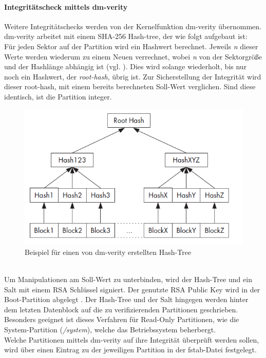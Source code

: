 	\paragraph{Integritätscheck mittels dm-verity}
	Weitere Integritätschecks werden von der Kernelfunktion dm-verity übernommen.
	dm-verity arbeitet mit einem SHA-256 Hash-tree, der wie folgt aufgebaut ist:\\
	Für jeden Sektor auf der Partition wird ein Hashwert berechnet. Jeweils
	\textit{n} dieser Werte werden wiederum zu einem Neuen verrechnet, wobei
	\textit{n} von der Sektorgröße und der Hashlänge abhängig ist (vgl. \cite{dm-verity-doc}). Dies wird solange wiederholt, bis nur noch ein
	Hashwert, der \textit{root-hash}, übrig ist. Zur Sicherstellung der Integrität
	wird dieser root-hash, mit einem bereits berechneten Soll-Wert verglichen.
	Sind diese identisch, ist die Partition integer.
	\begin{figure}[h]
		\centering
		\includegraphics[width=0.7\linewidth]{android_pages/graphics/dm_verity_hash_tree.png}
		\caption{Beispiel für einen von dm-verity erstellten Hash-Tree \cite[S. 255]{Drake2014}}
		\label{fig:dm-verity-table}
	\end{figure}
	\\
	Um Manipulationen am Soll-Wert zu unterbinden, wird der Hash-Tree und ein Salt
	mit einem RSA Schlüssel signiert. Der genutzte RSA Public Key wird in der
	Boot-Partition abgelegt \cite[S. 255]{Drake2014}. Der Hash-Tree und der Salt
	hingegen werden hinter dem letzten Datenblock auf die zu verifizierenden
	Partitionen geschrieben. Besonders geeignet ist dieses Verfahren für Read-Only
	Partitionen, wie die System-Partition (\textit{/system}), welche das
	Betriebssystem beherbergt.\\
	Welche Partitionen mittels dm-verity auf ihre Integrität überprüft werden
	sollen, wird über einen Eintrag zu der jeweiligen Partition in der fstab-Datei
	festgelegt.

